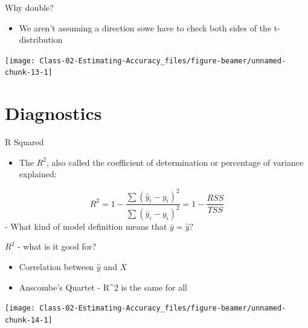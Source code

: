 \documentclass[
  ignorenonframetext,
]{beamer}
\providecommand{\tightlist}{%
  \setlength{\itemsep}{0pt}\setlength{\parskip}{0pt}}
\begin{document}
\begin{frame}{Why double?}
\protect\hypertarget{why-double}{}

\begin{itemize}
\tightlist
\item
  We aren't assuming a direction sowe have to check both sides of the
  t-distribution
\end{itemize}

\begin{center}\texttt{[image: Class-02-Estimating-Accuracy\_files/figure-beamer/unnamed-chunk-13-1]} \end{center}

\end{frame}

\hypertarget{diagnostics}{%
\section{Diagnostics}\label{diagnostics}}

\begin{frame}{R Squared}
\protect\hypertarget{r-squared}{}

\begin{itemize}
\tightlist
\item
  The \(R^2\), also called the coefficient of determination or
  percentage of variance explained:
\end{itemize}

\[
R^2 = 1 - \frac{\sum(\hat{y}_i - y_i)^2}{\sum(\bar{y}_i - y_i)^2} = 1 - \frac{RSS}{TSS}
\] - What kind of model definition means that \(\bar{y} =\hat{y}\)?

\end{frame}

\begin{frame}{\(R^2\) - what is it good for?}
\protect\hypertarget{r2---what-is-it-good-for}{}

\begin{itemize}
\tightlist
\item
  Correlation between \(\hat{y}\) and \(X\)
\item
  Anscombe's Quartet - R\^{}2 is the same for all
\end{itemize}

\begin{center}\texttt{[image: Class-02-Estimating-Accuracy\_files/figure-beamer/unnamed-chunk-14-1]} \end{center}

\end{frame}
\end{document}
